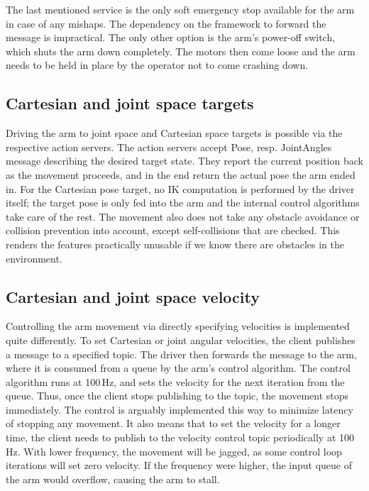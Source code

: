 \documentclass[buriama8_dp.tex]{subfiles}
\begin{document}
The last mentioned service is the only soft emergency stop available for the arm in case of any mishaps. The dependency on the framework to forward the message is impractical. The only other option is the arm's power-off switch, which shuts the arm down completely. The motors then come loose and the arm needs to be held in place by the operator not to come crashing down.

\subsection{Cartesian and joint space targets}
\label{subsec:api_cart_action}

Driving the arm to joint space and Cartesian space targets is possible via the respective action servers. The action servers accept Pose, resp. JointAngles message describing the desired target state. They report the current position back as the movement proceeds, and in the end return the actual pose the arm ended in. For the Cartesian pose target, no IK computation is performed by the driver itself; the target pose is only fed into the arm and the internal control algorithms take care of the rest. The movement also does not take any obstacle avoidance or collision prevention into account, except self-collisions that are checked. This renders the features practically unusable if we know there are obstacles in the environment.

\subsection{Cartesian and joint space velocity}
\label{subsec:api_cart_vel}

Controlling the arm movement via directly specifying velocities is implemented quite differently. To set Cartesian or joint angular velocities, the client publishes a message to a specified topic. The driver then forwards the message to the arm, where it is consumed from a queue by the arm's control algorithm. The control algorithm runs at 100\,Hz, and sets the velocity for the next iteration from the queue. Thus, once the client stops publishing to the topic, the movement stops immediately. The control is arguably implemented this way to minimize latency of stopping any movement. It also means that to set the velocity for a longer time, the client needs to publish to the velocity control topic periodically at 100\,Hz. With lower frequency, the movement will be jagged, as some control loop iterations will set zero velocity. If the frequency were higher, the input queue of the arm would overflow, causing the arm to stall.
\end{document}
